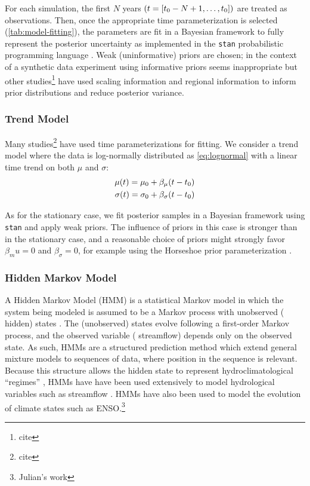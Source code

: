 \documentclass[12pt]{article}
\begin{document}
For each simulation, the first \(N\) years \(\qty(t=[t_0-N+1, \ldots, t_0])\) are treated as observations.
Then, once the appropriate time parameterization is selected (\cref{tab:model-fitting}), the parameters are fit in a Bayesian framework to fully represent the posterior uncertainty as implemented in the \texttt{stan} probabilistic programming language \citep{Carpenter2016}.
Weak (uninformative) priors are chosen; in the context of a synthetic data experiment using informative priors seems inappropriate but other studies\footnote{cite} have used scaling information and regional information to inform prior distributions and reduce posterior variance.

\subsubsection{Trend Model\label{sec:method-trend}}

Many studies\footnote{cite} have used time parameterizations for fitting.
We consider a trend model where the data is log-normally distributed as \cref{eq:lognormal} with a linear time trend on both \( \mu \) and \( \sigma \):
\begin{align}
  \mu(t) = \mu_0 + \beta_\mu \qty(t - t_0) \\
  \sigma(t) = \sigma_0 + \beta_\sigma \qty(t - t_0)
\end{align}

As for the stationary case, we fit posterior samples in a Bayesian framework using \texttt{stan} and apply weak priors.
The influence of priors in this case is stronger than in the stationary case, and a reasonable choice of priors might strongly favor \(\beta_mu=0\) and \(\beta_\sigma=0\), for example using the Horseshoe prior parameterization \citep{Piironen2016a}.

\subsubsection{Hidden Markov Model\label{sec:method-HMM}}

A Hidden Markov Model (HMM) is a statistical Markov model in which the system being modeled is assumed to be a Markov process with unobserved (\ie{} hidden) states \citep{Rabiner1986}.
The (unobserved) states evolve following a first-order Markov process, and the observed variable (\ie{} streamflow) depends only on the observed state.
As such, HMMs are a structured prediction method which extend general mixture models to sequences of data, where position in the sequence is relevant.
Because this structure allows the hidden state to represent hydroclimatological ``regimes'' \citep{Reinhold1982,Michelangeli1995,Merz2014}, HMMs have have been used extensively to model hydrological variables such as streamflow \citep{Bracken2016}.
HMMs have also been used to model the evolution of climate states such as ENSO.\footnote{Julian's work}
\end{document}
